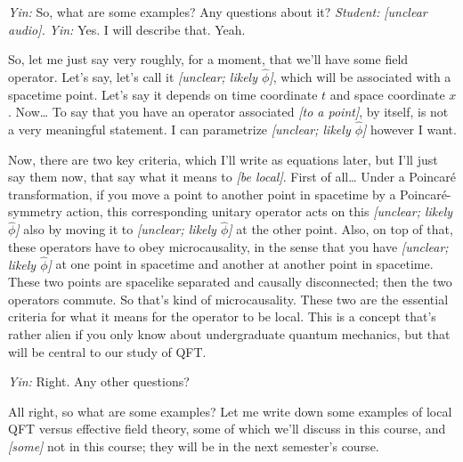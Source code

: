
\textit{Yin:} So, what are some examples? Any questions about it?
\quad\textit{Student:} \emph{[unclear audio].}
\quad\textit{Yin:} Yes. I will describe that. Yeah.

So, let me just say very roughly, for a moment, that we'll have some field
operator. Let's say, let's call it \emph{[unclear; likely
$\hat\phi$]}, which will be associated with a spacetime point. Let's say it
depends on time coordinate $t$ and space coordinate $x$. Now\ldots{} To say
that you have an operator associated \emph{[to a point]}, by itself, is not a
very meaningful statement. I can parametrize \emph{[unclear; likely
$\hat\phi$]} however I want.

Now, there are two key criteria, which I'll write as equations later, but I'll
just say them now, that say what it means to \emph{[be local]}. First of
all\ldots{} Under a Poincar\'e transformation, if you move a point to another
point in spacetime by a Poincar\'e-symmetry action, this corresponding unitary
operator acts on this \emph{[unclear; likely $\hat\phi$]} also by moving it to
\emph{[unclear; likely $\hat\phi$]} at the other point. Also, on top of that,
these operators have to obey microcausality, in the sense that you have
\emph{[unclear; likely $\hat\phi$]} at one point in spacetime and another at
another point in spacetime. These two points are spacelike separated and
causally disconnected; then the two operators commute. So that's kind of
microcausality. These two are the essential criteria for what it means for the
operator to be local. This is a concept that's rather alien if you only know
about undergraduate quantum mechanics, but that will be central to our study
of QFT.

\textit{Yin:} Right. Any other questions?

All right, so what are some examples? Let me write down some examples of local
QFT versus effective field theory, some of which we'll discuss in this course,
and \emph{[some]} not in this course; they will be in the next semester's
course.

